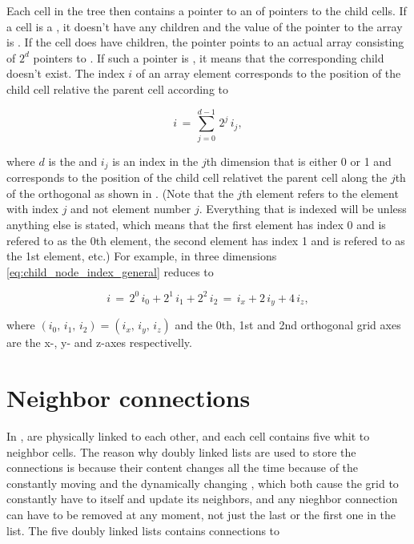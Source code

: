 Each cell in the tree then contains a pointer to an  of pointers to the child cells. If a cell is a , it doesn't have any children and the value of the pointer to the array is \NULL. If the cell does have children, the pointer points to an actual array consisting of $2^d$ pointers to . If such a pointer is \NULL, it means that the corresponding child doesn't exist. The index $i$ of an array element corresponds to the position of the child cell relative the parent cell according to

\begin{equation} \label{eq:child_node_index_general}
i \,=\, \sum_{j=0}^{d-1} \,2^j\,i_j,
\end{equation}

where $d$ is the \dimensionality and $i_j$ is an index in the $j$th dimension that is either 0 or 1 and corresponds to the position of the child cell relativet the parent cell along the $j$th of the orthogonal  as shown in . (Note that the $j$th element refers to the element with index $j$ and not element number $j$. Everything that is indexed will be  unless anything else is stated, which means that the first element has index 0 and is refered to as the 0th element, the second element has index 1 and is refered to as the 1st element, etc.) For example, in three dimensions \eqref{eq:child_node_index_general} reduces to

\begin{equation} \label{eq:child_node_index_three_dimensions}
i \,=\, 2^0\,i_0 + 2^1\,i_1 + 2^2\,i_2 \,=\, i_x + 2\,i_y + 4\,i_z,
\end{equation}

where $(i_0,\,i_1,\,i_2) = (i_x,\,i_y,\,i_z)$ and the 0th, 1st and 2nd orthogonal grid axes are the x-, y- and z-axes respectivelly.

\section{Neighbor connections}

In \thisprojectwork,  are physically linked to each other, and each cell contains five  whit  to neighbor cells. The reason why doubly linked lists are used to store the connections is because their content changes all the time because of the constantly moving  and the dynamically changing \LODs, which both cause the grid to constantly have to \remesh itself and update its neighbors, and any nieghbor connection can have to be removed at any moment, not just the last or the first one in the list. The five doubly linked lists contains connections to


